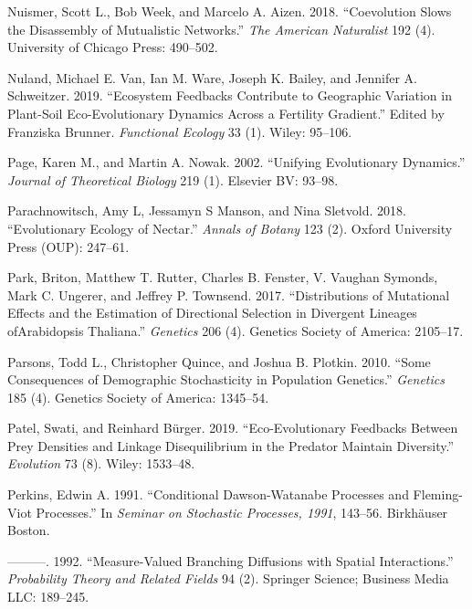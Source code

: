 \documentclass[]{article}
\begin{document}
\leavevmode\hypertarget{ref-Nuismer2018}{}%
Nuismer, Scott L., Bob Week, and Marcelo A. Aizen. 2018. ``Coevolution
Slows the Disassembly of Mutualistic Networks.'' \emph{The American
Naturalist} 192 (4). University of Chicago Press: 490--502.

\leavevmode\hypertarget{ref-VanNuland2019}{}%
Nuland, Michael E. Van, Ian M. Ware, Joseph K. Bailey, and Jennifer A.
Schweitzer. 2019. ``Ecosystem Feedbacks Contribute to Geographic
Variation in Plant-Soil Eco-Evolutionary Dynamics Across a Fertility
Gradient.'' Edited by Franziska Brunner. \emph{Functional Ecology} 33
(1). Wiley: 95--106.

\leavevmode\hypertarget{ref-PAGE2002}{}%
Page, Karen M., and Martin A. Nowak. 2002. ``Unifying Evolutionary
Dynamics.'' \emph{Journal of Theoretical Biology} 219 (1). Elsevier BV:
93--98.

\leavevmode\hypertarget{ref-Parachnowitsch2018}{}%
Parachnowitsch, Amy L, Jessamyn S Manson, and Nina Sletvold. 2018.
``Evolutionary Ecology of Nectar.'' \emph{Annals of Botany} 123 (2).
Oxford University Press (OUP): 247--61.

\leavevmode\hypertarget{ref-Park2017}{}%
Park, Briton, Matthew T. Rutter, Charles B. Fenster, V. Vaughan Symonds,
Mark C. Ungerer, and Jeffrey P. Townsend. 2017. ``Distributions of
Mutational Effects and the Estimation of Directional Selection in
Divergent Lineages ofArabidopsis Thaliana.'' \emph{Genetics} 206 (4).
Genetics Society of America: 2105--17.

\leavevmode\hypertarget{ref-Parsons2010}{}%
Parsons, Todd L., Christopher Quince, and Joshua B. Plotkin. 2010.
``Some Consequences of Demographic Stochasticity in Population
Genetics.'' \emph{Genetics} 185 (4). Genetics Society of America:
1345--54.

\leavevmode\hypertarget{ref-Patel2019}{}%
Patel, Swati, and Reinhard Bürger. 2019. ``Eco-Evolutionary Feedbacks
Between Prey Densities and Linkage Disequilibrium in the Predator
Maintain Diversity.'' \emph{Evolution} 73 (8). Wiley: 1533--48.

\leavevmode\hypertarget{ref-Perkins1991}{}%
Perkins, Edwin A. 1991. ``Conditional Dawson-Watanabe Processes and
Fleming-Viot Processes.'' In \emph{Seminar on Stochastic Processes,
1991}, 143--56. Birkhäuser Boston.

\leavevmode\hypertarget{ref-Perkins1992}{}%
---------. 1992. ``Measure-Valued Branching Diffusions with Spatial
Interactions.'' \emph{Probability Theory and Related Fields} 94 (2).
Springer Science; Business Media LLC: 189--245.
\end{document}

